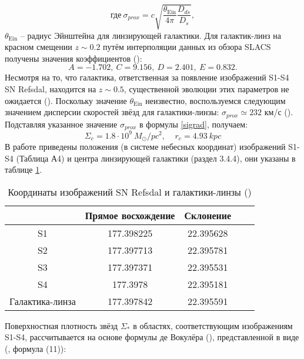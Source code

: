 \begin{equation}\label{sigmaprox}
\textrm{где} \ \sigma_{prox}=c \sqrt{\frac{\theta_{\text {Ein}}}{4 \pi} \frac{D_{ds}}{D_{s}}},
\end{equation}
$\theta_{\text {Ein}}$ -- радиус Эйнштейна для линзирующей галактики. Для галактик-линз на красном смещении $z \sim 0.2$ путём интерполяции данных из обзора SLACS получены значения коэффициентов (\cite{schechter2014}): $$ A = -1.702, \ C = 9.156, \ D = 2.401, \ E = 0.832. $$ Несмотря на то, что галактика, ответственная за появление изображений S1-S4 SN Refsdal, находится на $z \sim 0.5$, существенной эволюции этих параметров не ожидается (\cite{2013ApJ...779L..21B}). Поскольку значение $\theta_{\text {Ein}}$ неизвестно, воспользуемся следующим значением дисперсии скоростей звёзд для галактики-линзы: $\sigma_{prox} \simeq 232$ км/с (\cite{kawamataoguri}). %
Подставляя указанное  значение $\sigma_{prox}$ в формулы \eqref{sigrad}, получаем: $$\Sigma_e = 1.8 \cdot 10^9 \ M_{\odot}/pc^2, \ \ \ \ \ r_e=4.93 \ kpc$$
В работе \cite{kawamataoguri} приведены положения (в системе небесных координат) изображений S1-S4 (Таблица А4) и центра линзирующей галактики (раздел 3.4.4), они указаны в таблице \ref{tab:coord}.

\begin{table}[h!]
  \caption{Координаты изображений SN Refsdal и галактики-линзы (\cite{kawamataoguri})}
  \label{tab:coord}
  \centering
    \begin{tabular}{ | c | c | c | c | c |}
    \hline
     & Прямое восхождение & Склонение \\ \hline
    S1 & 177.398225 & 22.395628 \\ \hline
    S2 & 177.397713 & 22.395781 \\\hline
    S3 & 177.397371 & 22.395531 \\ \hline
    S4 & 177.3978   & 22.395181 \\\hline
    Галактика-линза & 177.397842 & 22.395591 \\\hline
    \end{tabular}
\end{table}

Поверхностная плотность звёзд $\Sigma_*$ в областях, соответствующим изображениям S1-S4, рассчитывается на основе формулы де Вокулёра (\cite{vaucouleurs}), представленной в виде (\cite{schechter2014}, формула (11)):

